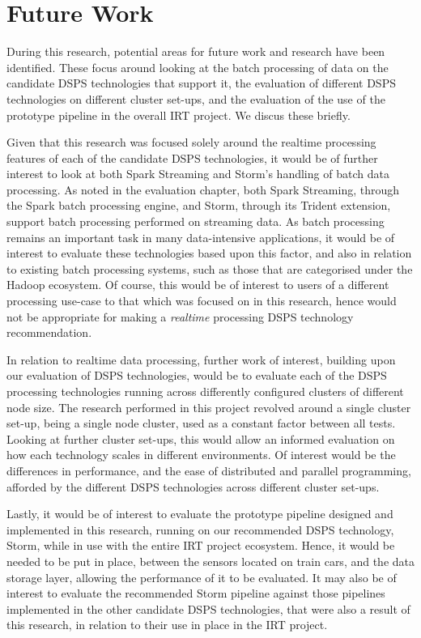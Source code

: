 \section{Future Work} %
\label{sub:future_work}

During this research, potential areas for future work and research have been identified. These focus around looking at
the batch processing of data on the candidate DSPS technologies that support it, the evaluation of different DSPS technologies on different
cluster set-ups, and the evaluation of the use of the prototype pipeline in the overall IRT project. We discus these briefly.

Given that this research was focused solely around the realtime processing features of each of the candidate DSPS technologies,
it would be of further interest to look at both Spark Streaming and Storm's handling of batch data processing. As noted
in the evaluation chapter, both Spark Streaming, through the Spark batch processing engine, and Storm, through its
Trident extension, support batch processing performed on streaming data. As batch processing remains an important task
in many data-intensive applications, it would be of interest to evaluate these technologies based upon this factor, and also in relation
to existing batch processing systems, such as those that are categorised under the Hadoop ecosystem. Of course, this would
be of interest to users of a different processing use-case to that which was focused on in this research, hence would
not be appropriate for making a \textit{realtime} processing DSPS technology recommendation.

In relation to realtime data processing, further work of interest, building upon our evaluation of DSPS technologies, would
be to evaluate each of the DSPS processing technologies running across differently configured clusters of different node size.
The research performed in this project revolved around a single cluster set-up, being a single node cluster, used as a constant factor between all
tests. Looking at further cluster set-ups, this would allow an informed evaluation on how each technology scales in different environments.
Of interest would be the differences in performance, and the ease of distributed and parallel programming, afforded by the different DSPS technologies across
different cluster set-ups.

Lastly, it would be of interest to evaluate the prototype pipeline designed and implemented in this research, running on our recommended
DSPS technology, Storm, while in use with the entire IRT project ecosystem. Hence, it would be needed to be put in place,
between the sensors located on train cars, and the data storage layer, allowing the performance of it to be evaluated.
It may also be of interest to evaluate the recommended Storm pipeline against those pipelines implemented in the other candidate DSPS technologies,
that were also a result of this research, in relation to their use in place in the IRT project.

